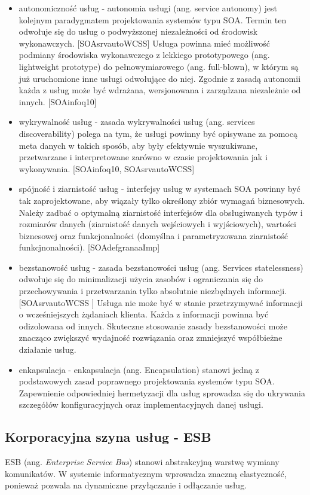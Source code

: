 \begin{itemize}
\item{autonomiczność usług - autonomia usługi (ang. service autonomy) jest kolejnym paradygmatem projektowania systemów typu SOA. Termin ten odwołuje się do usług o podwyższonej niezależności od środowisk wykonawczych. [SOAsrvautoWCSS] Usługa powinna mieć możliwość podmiany środowiska wykonawczego z lekkiego prototypowego (ang. lightweight prototype) do pełnowymiarowego (ang. full-blown), w którym są już uruchomione inne usługi odwołujące do niej. Zgodnie z zasadą autonomii każda z usług może być wdrażana, wersjonowana i zarządzana niezależnie od innych. [SOAinfoq10]}
\item{wykrywalność usług - zasada wykrywalności usług (ang. services discoverability) polega na tym, że usługi powinny być opisywane za pomocą meta danych w takich sposób, aby były efektywnie wyszukiwane, przetwarzane i interpretowane zarówno w czasie projektowania jak i wykonywania. [SOAinfoq10, SOAsrvautoWCSS]}
\item{spójność i ziarnistość usług - interfejsy usług w systemach SOA powinny być tak zaprojektowane, aby wiązały tylko określony zbiór wymagań biznesowych. \cite{SOAsdj102009} Należy zadbać o optymalną ziarnistość interfejsów dla obsługiwanych typów i rozmiarów danych (ziarnistość danych wejściowych i wyjściowych), wartości biznesowej oraz funkcjonalności (domyślna i parametryzowana ziarnistość funkcjnonalności). [SOAdefgranaaImp]}
\item{bezstanowość usług - zasada bezstanowości usług (ang. Services statelessness) odwołuje się do minimalizacji użycia zasobów i ograniczania się do przechowywania i przetwarzania tylko absolutnie niezbędnych informacji.  [SOAsrvautoWCSS ] Usługa nie może być w stanie przetrzymywać informacji o wcześniejszych żądaniach klienta. Każda z informacji powinna być odizolowana od innych. Skuteczne stosowanie zasady bezstanowości może znacząco zwiększyć wydajność rozwiązania oraz zmniejszyć współbieżne działanie usług. \cite{SOAsdj102009}}
\item{enkapsulacja - enkapsulacja (ang. Encapsulation) stanowi jedną z podstawowych zasad poprawnego projektowania systemów typu SOA. Zapewnienie odpowiedniej hermetyzacji dla usług sprowadza się do ukrywania szczegółów konfiguracyjnych oraz implementacyjnych danej usługi.}
\end{itemize}

\subsection{Korporacyjna szyna usług - ESB}
ESB (ang. \textit{Enterprise Service Bus}) stanowi abstrakcyjną warstwę wymiany komunikatów. W systemie informatycznym wprowadza znaczną elastyczność, ponieważ pozwala na dynamiczne przyłączanie i odłączanie usług. \cite{PlatIntGor}

